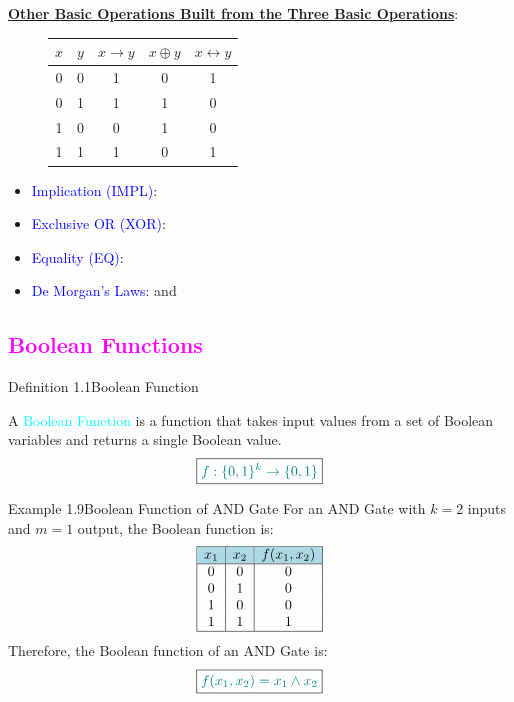 \documentclass{book}
\begin{document}
\uline{\textbf{Other Basic Operations Built from the Three Basic Operations}}:
\begin{figure}
    \begin{tabular}{|c|c|c|c|c|}
        \hline
        \rowcolor{lightblue}
        \(x\) & \(y\) & \(x \rightarrow y\) & \(x \oplus y\) & \(x \leftrightarrow y\)\\
        \hline
        0 & 0 & 1 & 0 & 1\\
        0 & 1 & 1 & 1 & 0\\
        1 & 0 & 0 & 1 & 0\\
        1 & 1 & 1 & 0 & 1\\
        \hline
    \end{tabular}
\end{figure}
\begin{itemize}
    \item \textcolor{blue}{Implication (IMPL)}: \fbox{\textcolor{teal}{\(x \rightarrow y = \neg x \lor y\)}}\\
    \item \textcolor{blue}{Exclusive OR (XOR)}: \fbox{\textcolor{teal}{\(x \oplus y = (x \land \neg y) \lor (\neg x \land y)\)}}\\
    \item \textcolor{blue}{Equality (EQ)}: \fbox{\textcolor{teal}{\(x \leftrightarrow y = (x \land y) \lor (\neg x \land \neg y)\)}}\\
    \item \textcolor{blue}{De Morgan's Laws}: \fbox{\textcolor{teal}{\(x \land y = \neg (\neg x \lor \neg y)\)}} and \fbox{\textcolor{teal}{\(x \lor y = \neg (\neg x \land \neg y)\)}}\\
\end{itemize}
\newpage
\textcolor{magenta}{\section{\textbf{Boolean Functions}}}
\begin{defBox}{Definition 1.1}{Boolean Function}
    \raggedright
    A \textcolor{cyan}{Boolean Function} is a function that takes input values from a set of Boolean variables and returns a single Boolean value.\\
    \[
    \boxed{\textcolor{teal}{f: \{0, 1\}^k \rightarrow \{0, 1\}}}
    \]
\end{defBox}
\begin{egBox}{Example 1.9}{Boolean Function of AND Gate}
    For an AND Gate with $k=2$ inputs and $m=1$ output, the Boolean function is:
    \[
    \begin{array}{|c|c|c|}
        \hline
        \rowcolor{lightblue}
        $$x_1$$ & $$x_2$$ & $$f(x_1, x_2)$$\\
        \hline
        0 & 0 & 0\\
        0 & 1 & 0\\
        1 & 0 & 0\\
        1 & 1 & 1\\
        \hline
    \end{array}
    \]
    Therefore, the Boolean function of an AND Gate is:
    \[
    \boxed{\textcolor{teal}{f(x_1, x_2) = x_1 \land x_2}}
    \]
\end{egBox}
\end{document}
